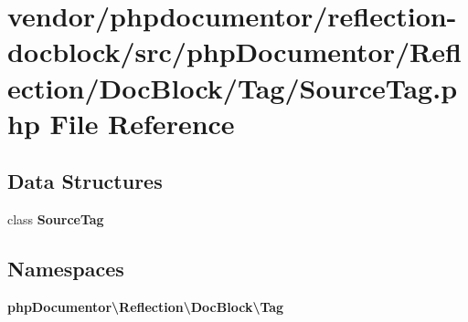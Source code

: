 \section{vendor/phpdocumentor/reflection-\/docblock/src/php\+Documentor/\+Reflection/\+Doc\+Block/\+Tag/\+Source\+Tag.php File Reference}
\label{_source_tag_8php}
\subsection*{Data Structures}
\begin{DoxyCompactItemize}
\item 
class {\bf Source\+Tag}
\end{DoxyCompactItemize}
\subsection*{Namespaces}
\begin{DoxyCompactItemize}
\item 
 {\bf php\+Documentor\textbackslash{}\+Reflection\textbackslash{}\+Doc\+Block\textbackslash{}\+Tag}
\end{DoxyCompactItemize}
